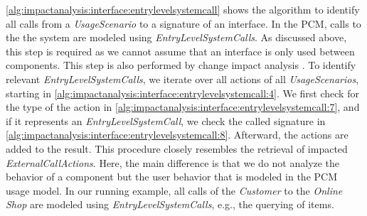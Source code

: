 \autoref{alg:impactanalysis:interface:entrylevelsystemcall} shows the algorithm to identify all calls from a \emph{UsageScenario} to a signature of an interface.
In the \ac{PCM}, calls to the the system are modeled using \emph{EntryLevelSystemCalls}.
As discussed above, this step is required as we cannot assume that an interface is only used between components.
This step is also performed by change impact analysis \cite{busch_architecture-based_2020}.
To identify relevant \emph{EntryLevelSystemCalls}, we iterate over all actions of all \emph{UsageScenarios}, starting in \autoref{alg:impactanalysis:interface:entrylevelsystemcall:4}.
We first check for the type of the action in \autoref{alg:impactanalysis:interface:entrylevelsystemcall:7}, and if it represents an \emph{EntryLevelSystemCall}, we check the called signature in \autoref{alg:impactanalysis:interface:entrylevelsystemcall:8}.
Afterward, the actions are added to the result.
This procedure closely resembles the retrieval of impacted \emph{ExternalCallActions}.
Here, the main difference is that we do not analyze the behavior of a component but the user behavior that is modeled in the \ac{PCM} usage model.
In our running example, all calls of the \emph{Customer} to the \emph{Online Shop} are modeled using \emph{EntryLevelSystemCalls}, e.g., the querying of items.



